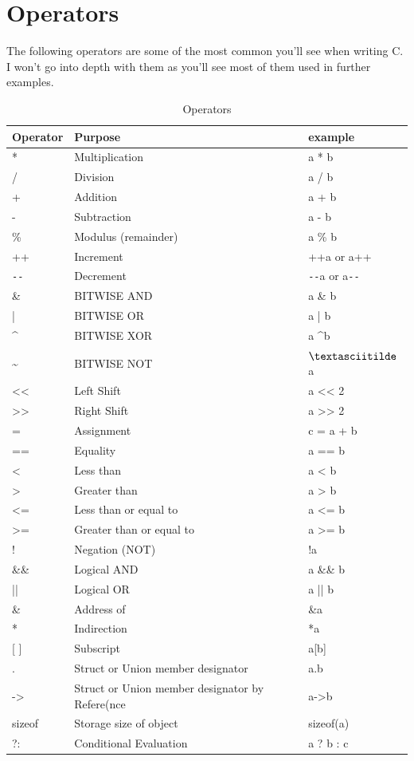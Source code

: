 \documentclass[../main.tex]{subfiles}
\begin{document}
	\section{Operators}
	
	The following operators are some of the most common you'll see when writing C.  I won't go into depth with them as you'll see most of them used in further examples.
	
	\begin{table}[h]
		\centering
		\begin{tabular}{l l l}
			\toprule
			\textbf{Operator} & \textbf{Purpose} & \textbf{example}\\
			\midrule
			* 	& Multiplication 	& a * b \\
			/ 	& Division 			& a / b \\
			+ 	& Addition 			& a + b \\
			- 	& Subtraction 		& a - b \\
			\% 	& Modulus (remainder) & a \% b \\
			++ 	& Increment 		& ++a or a++ \\
			\verb|--| & Decrement 	& \verb|--|a or a\verb|--| \\
			\& 	& BITWISE AND 		& a \& b \\
			| 	& BITWISE OR 		& a | b \\
			\textasciicircum 	& BITWISE XOR 		& a \textasciicircum b \\
			\textasciitilde 	& BITWISE NOT 		& $\textasciitilde$a \\
			<< 	& Left Shift 		& a << 2 \\
			>> 	& Right Shift 		& a >> 2 \\
			= 	& Assignment 		& c = a + b \\
			==	& Equality 			& a == b \\
			<	& Less than			& a < b \\
			>	& Greater than		& a > b \\
			<=	& Less than or equal to & a <= b \\
			>=	& Greater than or equal to & a >= b \\
			!	& Negation (NOT)	& !a \\
			\&\&& Logical AND		& a \&\& b \\
			|| 	& Logical OR		& a || b \\
			\&	& Address of		& \&a \\
			*	& Indirection		& *a \\
			{[ ]}	& Subscript		& a[b] \\
			.	& Struct or Union member designator & a.b \\
			->	& Struct or Union member designator by Refere(nce & a->b \\
			sizeof & Storage size of object & sizeof(a) \\
			?:	& Conditional Evaluation & a ? b : c \\
			\bottomrule
		\end{tabular}
		\caption{Operators}
		\label{tab:operators}
	\end{table}
\end{document}

